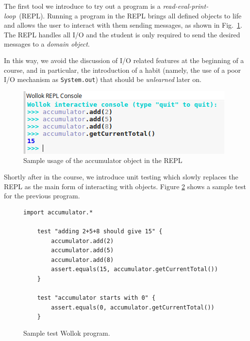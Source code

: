 The first tool we introduce to try out a program 
is a \emph {read-eval-print-loop}~(REPL). Running a program in the REPL brings all defined objects to life and allows the user to interact with them sending messages, as shown in Fig.~\ref{fig:repl}. 
The REPL handles all I/O and the student is only required to send the desired messages to a \emph{domain object}.

In this way, we avoid the discussion of I/O related features at the beginning of a course, and in particular, the introduction of a habit (namely, the use of a poor I/O mechanism as \texttt{System.out}) that should be \emph{unlearned} later on.


\begin{figure}[ht]
 \centering
 \includegraphics[scale=0.6]{../images/accumulator-repl.png}
 \caption{\small Sample usage of the accumulator object in the REPL}
 \label{fig:repl}
\end{figure}




\medskip
Shortly after in the course, we introduce unit testing which slowly replaces the REPL as the main form of interacting with objects. Figure \ref{fig:test} shows a sample test for the previous program. 

\begin{figure}[ht]
 \centering
 \begin{lstlisting}[language=Wollok]
 	import accumulator.*

	test "adding 2+5+8 should give 15" {
		accumulator.add(2)
		accumulator.add(5)
		accumulator.add(8)
		assert.equals(15, accumulator.getCurrentTotal())		
	}
   
	test "accumulator starts with 0" {
		assert.equals(0, accumulator.getCurrentTotal())
	}\end{lstlisting}
\vspace{-3mm}
\caption{\small Sample test Wollok program.}
\vspace{-5mm}
\label{fig:test}
\end{figure}

